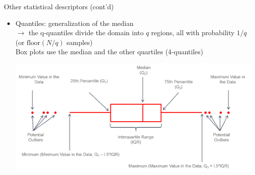 \documentclass{beamer}
\begin{document}
\begin{frame}{Other statistical descriptors (cont'd)}

\begin{itemize}

\item Quantiles: generalization of the median\\
$\rightarrow$ the q-quantiles divide the domain into $q$ regions, all with probability $1/q$ (or $\textrm{floor}(N/q)$ samples)\\
\vspace{0.2cm}
Box plots use the median and the other quartiles (4-quantiles)
\begin{center}
\includegraphics[scale=0.25]{boxplot_explanation.png}\\
\end{center}
\end{itemize}
\end{frame}
\end{document}
